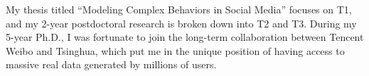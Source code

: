 \documentclass[10.5pt]{article}
\begin{document}
\vskip 0.05in
\vskip 0.01in

My thesis titled ``Modeling Complex Behaviors in Social Media'' focuses on T1,
and my 2-year postdoctoral research is broken down into T2 and T3.
During my 5-year Ph.D., I was fortunate to join the long-term collaboration between Tencent Weibo and Tsinghua, which put me in the unique position of having access to massive real data generated by millions of users.

\vskip 0.03in
\vskip 0.01in



\end{document}
